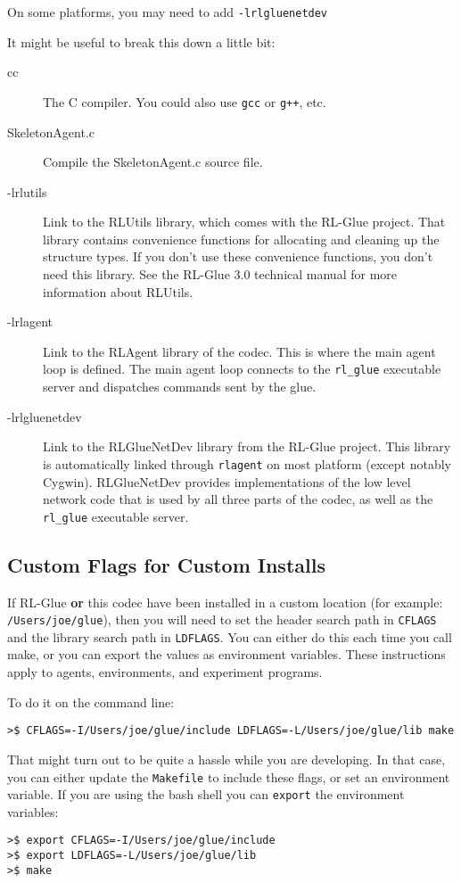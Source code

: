 \documentclass[11pt]{article}
\begin{document}
On some platforms, you may need to add \texttt{-lrlgluenetdev}

It might be useful to break this down a little bit:
\begin{description}
\item [cc] The C compiler.  You could also use \texttt{gcc} or \texttt{g++}, etc.
\item [SkeletonAgent.c] Compile the SkeletonAgent.c source file.
\item [-lrlutils] Link to the RLUtils library, which comes with the RL-Glue project.  That library contains convenience functions for allocating and cleaning up the structure types.  If you 
don't use these convenience functions, you don't need this library.  See the RL-Glue 3.0 technical manual for more information about RLUtils.
\item [-lrlagent] Link to the RLAgent library of the codec.  This is where the main agent loop is defined. The main agent loop connects to the \texttt{rl\_glue} executable server and dispatches commands sent by the glue.
\item [-lrlgluenetdev] Link to the RLGlueNetDev library from the RL-Glue project.  This library is automatically linked through \texttt{rlagent} on most platform (except notably Cygwin).  
RLGlueNetDev provides implementations of the low level network code that is used by all three parts of the codec, as well as the \texttt{rl\_glue} executable server.
\end{description}

\subsection{Custom Flags for Custom Installs}
\label{sec:custom-flags}
If RL-Glue \textbf{or} this codec have been installed in a custom location (for example: \texttt{/Users/joe/glue}), then you will
need to set the header search path in \texttt{CFLAGS} and the library search path in \texttt{LDFLAGS}.  You can either do this each time you call make, 
or you can export the values as environment variables.  These instructions apply to agents, environments, and experiment programs.

To do it on the command line:
\begin{verbatim}
>$ CFLAGS=-I/Users/joe/glue/include LDFLAGS=-L/Users/joe/glue/lib make
\end{verbatim}

That might turn out to be quite a hassle while you are developing.  In that case, you can either update the \texttt{Makefile} to include these flags, 
or set an environment variable.  If you are using the bash shell you can \texttt{export} the environment variables:
\begin{verbatim}
>$ export CFLAGS=-I/Users/joe/glue/include
>$ export LDFLAGS=-L/Users/joe/glue/lib
>$ make
\end{verbatim}
\end{document}
